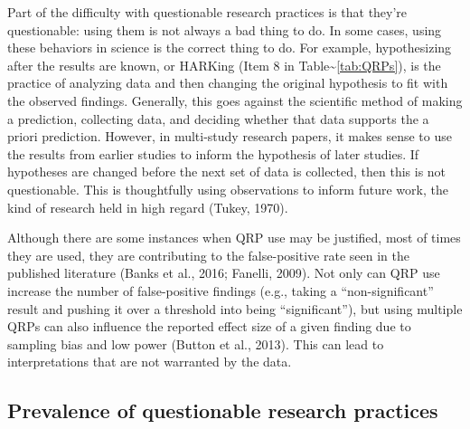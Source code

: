 \documentclass[,jou]{apa6}
\theoremstyle{definition}
\theoremstyle{definition}
\theoremstyle{definition}
\theoremstyle{remark}
\begin{document}
Part of the difficulty with questionable research practices is that
they're questionable: using them is not always a bad thing to do. In
some cases, using these behaviors in science is the correct thing to do.
For example, hypothesizing after the results are known, or HARKing (Item
8 in Table\textasciitilde{}\ref{tab:QRPs}), is the practice of analyzing
data and then changing the original hypothesis to fit with the observed
findings. Generally, this goes against the scientific method of making a
prediction, collecting data, and deciding whether that data supports the
a priori prediction. However, in multi-study research papers, it makes
sense to use the results from earlier studies to inform the hypothesis
of later studies. If hypotheses are changed before the next set of data
is collected, then this is not questionable. This is thoughtfully using
observations to inform future work, the kind of research held in high
regard (Tukey, 1970).

Although there are some instances when QRP use may be justified, most of
times they are used, they are contributing to the false-positive rate
seen in the published literature (Banks et al., 2016; Fanelli, 2009).
Not only can QRP use increase the number of false-positive findings
(e.g., taking a \enquote{non-significant} result and pushing it over a
threshold into being \enquote{significant}), but using multiple QRPs can
also influence the reported effect size of a given finding due to
sampling bias and low power (Button et al., 2013). This can lead to
interpretations that are not warranted by the data.

\subsection{Prevalence of questionable research
practices}\label{prevalence-of-questionable-research-practices}
\end{document}
